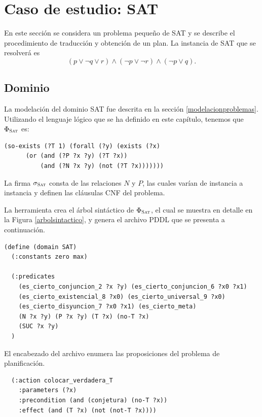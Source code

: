 
\chapter{Caso de estudio: SAT}
\label{apendiceB}

En este sección se considera un problema pequeño de SAT y se describe el
procedimiento de traducción y obtención de un plan.
La instancia de SAT que se resolverá es
\begin{equation}
\label{satinstance}
(p \lor \neg q \lor r) \land (\neg p \lor \neg r) \land (\neg p \lor q).
\end{equation}

\section{Dominio}
La modelación del dominio SAT fue descrita en la sección
\ref{modelacionproblemas}. Utilizando el lenguaje lógico que se ha definido en
este capítulo, tenemos que $\Phi_{\textsc{Sat}}$ es:
\begin{verbatim}
(so-exists (?T 1) (forall (?y) (exists (?x)
      (or (and (?P ?x ?y) (?T ?x)) 
          (and (?N ?x ?y) (not (?T ?x)))))))
\end{verbatim}

La firma $\sigma_{\textsc{Sat}}$ consta de las relaciones $N$ y $P$, las cuales 
varían de instancia a instancia y definen las cláusulas CNF del problema.

La herramienta crea el árbol sintáctico de $\Phi_{\textsc{Sat}}$, el cual se muestra en
detalle en la Figura \ref{arbolsintactico}, y genera el archivo PDDL que se
presenta a continuación.

\begin{verbatim}
(define (domain SAT)
  (:constants zero max)

  (:predicates
    (es_cierto_conjuncion_2 ?x ?y) (es_cierto_conjuncion_6 ?x0 ?x1)
    (es_cierto_existencial_8 ?x0) (es_cierto_universal_9 ?x0)
    (es_cierto_disyuncion_7 ?x0 ?x1) (es_cierto_meta)
    (N ?x ?y) (P ?x ?y) (T ?x) (no-T ?x)
    (SUC ?x ?y)
  )
\end{verbatim}

El encabezado del archivo enumera las proposiciones del problema de
planificación.

\begin{verbatim}
  (:action colocar_verdadera_T
    :parameters (?x)
    :precondition (and (conjetura) (no-T ?x))
    :effect (and (T ?x) (not (not-T ?x))))
\end{verbatim}

